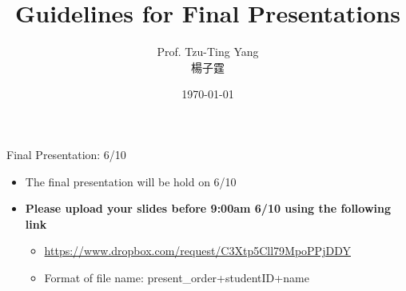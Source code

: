 \documentclass[dvipsnames,hyperref={pdfpagelabels=false}]{beamer}
\title[]  
{Guidelines for Final Presentations}
\author 
{Prof. Tzu-Ting Yang  \\ 楊子霆}
\institute{Institute of Economics, Academia Sinica  \\ 中央研究院經濟研究所}
\date
{\today}
\begin{document}
\begin{frame}{}
 \titlepage
\end{frame}


\begin{frame}{Final Presentation: 6/10}
	\begin{itemize}
		
		\item The final presentation will be hold on 6/10
		\vspace{0.2cm} 
%				
	   \item \textbf{Please upload your slides before 9:00am 6/10  using the following link}
	   \vspace{0.2cm}
	   \begin{itemize}
	   	\item \url{https://www.dropbox.com/request/C3Xtp5Cll79MpoPPjDDY}
	   	\vspace{0.2cm}
	   	\item Format of file name: present\_order+studentID+name

\end{itemize}
\end{itemize}
\end{frame}
\end{document}
